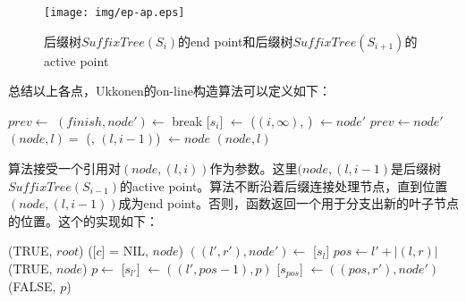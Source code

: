 \documentclass[UTF8]{article}
\begin{document}
\begin{figure}[htbp]
  \centering
  \texttt{[image: img/ep-ap.eps]}
  \caption{后缀树$SuffixTree(S_i)$的end point和后缀树$SuffixTree(S_{i+1})$的active point}
  \label{fig:ep-ap}
\end{figure}

总结以上各点，Ukkonen的on-line构造算法可以定义如下：

\begin{algorithmic}[1]
  \State $prev \gets$   %
  \Loop {}
    \State $(finish, node') \gets$ 
      \State break
    \EndIf
    \State {}[$s_i$] $\gets$ ($(i, \infty)$, )
    \State {} $\gets node'$
    \State $prev \gets node'$
    \State $(node, l) = $ (, $(l, i-1)$)
  \EndLoop
  \State {} $\gets node$
  \State \Return $(node, l)$ 
\EndFunction
\end{algorithmic}

算法接受一个引用对$(node, (l, i))$作为参数。这里$(node, (l, i-1)$是后缀树$SuffixTree(S_{i-1})$的active point。算法不断沿着后缀连接处理节点，直到位置$(node, (l, i-1))$成为end point。否则，函数返回一个用于分支出新的叶子节点的位置。这个的实现如下：

\begin{algorithmic}
      \State \Return (TRUE, $root$)
    \Else
      \State \Return ([$c$] = NIL, $node$)
    \EndIf
  \Else
    \State $((l', r'), node') \gets$ [$s_l$]
    \State $pos \gets l' + |(l, r)|$
      \State \Return (TRUE, $node$)
    \Else
      \State $p \gets$ 
      \State {}[$s_{l'}$] $\gets ((l', pos-1), p)$
      \State {}[$s_{pos}$] $\gets ((pos, r'), node')$
      \State \Return (FALSE, $p$)
    \EndIf
  \EndIf
\EndFunction
\end{algorithmic}
\end{document}
